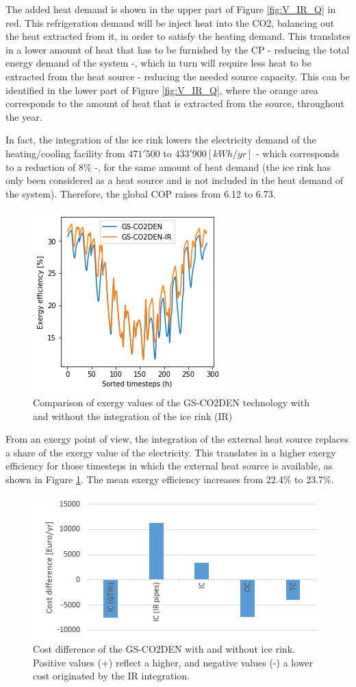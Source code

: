 \documentclass{article}
\begin{document}
The added heat demand is shown in the upper part of Figure \ref{fig:V_IR_Q} in red. This refrigeration demand will be inject heat into the CO2, balancing out the heat extracted from it, in order to satisfy the heating demand. This translates in a lower amount of heat that has to be furnished by the CP - reducing the total energy demand of the system -, which in turn will require less heat to be extracted from the heat source - reducing the needed source capacity. This can be identified in the lower part of Figure \ref{fig:V_IR_Q}, where the orange area corresponds to the amount of heat that is extracted from the source, throughout the year.

In fact, the integration of the ice rink lowers the electricity demand of the heating/cooling facility from $471'500$ to $433'900 [kWh/yr]$ - which corresponds to a reduction of 8\% -, for the same amount of heat demand (the ice rink has only been considered as a heat source and is not included in the heat demand of the system). Therefore, the global COP raises from 6.12 to 6.73.

\begin{figure}[tph]
	\centering
	\includegraphics[width=0.45\linewidth]{Images/V_IR_exe}
	\caption{Comparison of exergy values of the GS-CO2DEN technology with and without the integration of the ice rink (IR)}
	\label{fig:virexe}
\end{figure}

From an exergy point of view, the integration of the external heat source replaces a share of the exergy value of the electricity. This translates in a higher exergy efficiency for those timesteps in which the external heat source is available, as shown in Figure \ref{fig:virexe}. The mean exergy efficiency increases from 22.4\% to 23.7\%.

\begin{figure}[tph]
	\centering
	\includegraphics[width=0.7\linewidth]{Images/V_IR_cost}
	\caption{Cost difference of the GS-CO2DEN with and without ice rink. Positive values (+) reflect a higher, and negative values (-) a lower cost originated by the IR integration.}
	\label{fig:V_IR_cost}
\end{figure}
\end{document}
